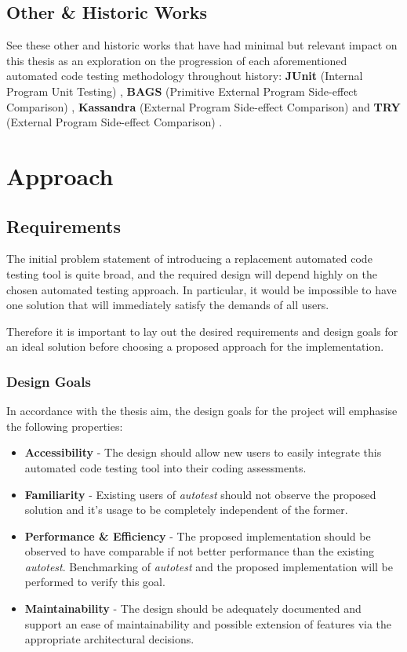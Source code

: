 \documentclass[hidelinks, 12pt]{extreport}
\newcommand{\unchapter}[2]{
    \setcounter{chapter}{#1}
    \setcounter{section}{0}
    \chapter*{#2}
    \addcontentsline{toc}{chapter}{#2}
}
\begin{document}
\section{Other \& Historic Works}
See these other and historic works that have had minimal but relevant impact on this thesis as an exploration on the progression of each aforementioned automated code testing methodology throughout history: \textbf{JUnit} (Internal Program Unit Testing) \cite{junit}, \textbf{BAGS} (Primitive External Program Side-effect Comparison) \cite{bags}, \textbf{Kassandra} (External Program Side-effect Comparison) \cite{kassandra} and \textbf{TRY} (External Program Side-effect Comparison) \cite{try}. 

\unchapter{4}{Approach}

\section{Requirements}

The initial problem statement of introducing a replacement automated code testing tool is quite broad, and the required design will depend highly on the chosen automated testing approach. In particular, it would be impossible to have one solution that will immediately satisfy the demands of all users.

Therefore it is important to lay out the desired requirements and design goals for an ideal solution before choosing a proposed approach for the implementation.

\subsection{Design Goals}

In accordance with the thesis aim, the design goals for the project will emphasise the following properties:

\begin{itemize}
	\item \textbf{Accessibility} - The design should allow new users to easily integrate this automated code testing tool into their coding assessments.
	\item \textbf{Familiarity} - Existing users of \textit{autotest} should not observe the proposed solution and it's usage to be completely independent of the former.
	\item \textbf{Performance \& Efficiency} - The proposed implementation should be observed to have comparable if not better performance than the existing \textit{autotest}. Benchmarking of \textit{autotest} and the proposed implementation will be performed to verify this goal.
	\item \textbf{Maintainability} - The design should be adequately documented and support an ease of maintainability and possible extension of features via the appropriate architectural decisions.
\end{itemize}
\end{document}
